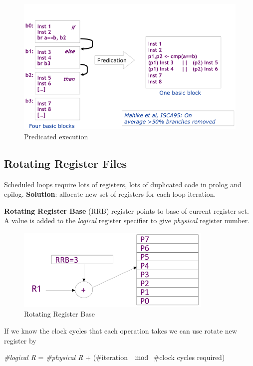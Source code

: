 \begin{figure}[h]
    \centering
    \includegraphics[scale = 0.4]{images/predicated-execution}
    \caption[Predicated execution]{Predicated execution}
    \label{fig:predicated-execution}
\end{figure}



\subsection{Rotating Register Files}\label{subsec:rotating-register-files}
Scheduled loops require lots of registers, lots of duplicated code in prolog and epilog.
\textbf{Solution}: allocate new set of registers for each loop iteration.

\textbf{Rotating Register Base} (RRB) register points to base of current register set.
A value is added to the \textit{logical} register specifier to give \textit{physical} register number.

\begin{figure}[h]
    \centering
    \includegraphics[scale = 0.4]{images/rotating-register-file-1}
    \caption{Rotating Register Base}
    \label{fig:rotating-register-base}
\end{figure}

If we know the clock cycles that each operation takes we can use rotate new register by
\begin{center}
    \textit{\#logical R} = \textit{\#physical R} $+$ (\#iteration \(\mod\) \#clock cycles required)
\end{center}

